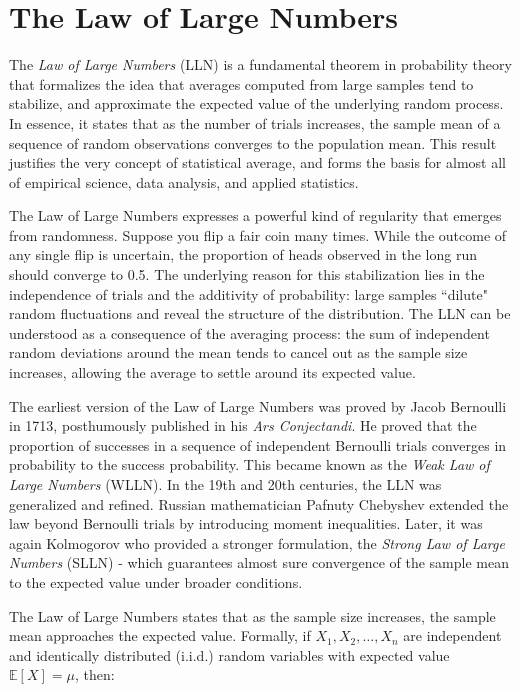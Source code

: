 \documentclass{book}
\begin{document}
 \newpage 
 
\section{The Law of Large Numbers}

The \textit{Law of Large Numbers} (LLN) is a fundamental theorem in probability theory that formalizes the idea that averages computed from large samples tend to stabilize, and approximate the expected value of the underlying random process. In essence, it states that as the number of trials increases, the sample mean of a sequence of random observations converges to the population mean. This result justifies the very concept of statistical average, and forms the basis for almost all of empirical science, data analysis, and applied statistics.

\medskip

The Law of Large Numbers expresses a powerful kind of regularity that emerges from randomness. Suppose you flip a fair coin many times. While the outcome of any single flip is uncertain, the proportion of heads observed in the long run should converge to 0.5. The underlying reason for this stabilization lies in the independence of trials and the additivity of probability: large samples ``dilute" random fluctuations and reveal the structure of the distribution. The LLN can be understood as a consequence of the averaging process: the sum of independent random deviations around the mean tends to cancel out as the sample size increases, allowing the average to settle around its expected value.

\medskip

The earliest version of the Law of Large Numbers was proved by {Jacob Bernoulli} in 1713, posthumously published in his \textit{Ars Conjectandi}. He proved that the proportion of successes in a sequence of independent Bernoulli trials converges in probability to the success probability. This became known as the \textit{Weak Law of Large Numbers} (WLLN). In the 19th and 20th centuries, the LLN was generalized and refined. Russian mathematician Pafnuty Chebyshev extended the law beyond Bernoulli trials by introducing moment inequalities. Later, it was again Kolmogorov who provided a stronger formulation, the \textit{Strong Law of Large Numbers} (SLLN) - which guarantees almost sure convergence of the sample mean to the expected value under broader conditions.

The Law of Large Numbers states that as the sample size increases, the sample mean approaches the expected value. Formally, if $X_1, X_2, \dots, X_n$ are independent and identically distributed (i.i.d.) random variables with expected value $\mathbb{E}[X] = \mu$, then:
\end{document}
